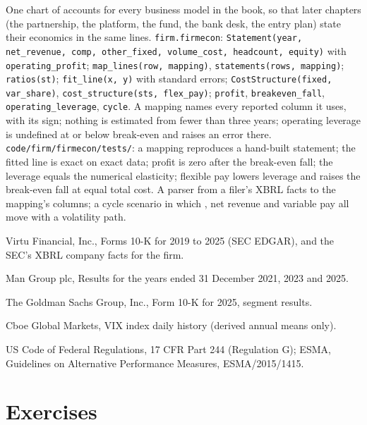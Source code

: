\begin{build}
 One chart of accounts for every business model in the book, so that later chapters (the partnership, the platform, the fund, the
bank desk, the entry plan) state their economics in the same lines.
 \texttt{firm.firmecon}: \texttt{Statement(year, net\_revenue, comp, other\_fixed, volume\_cost, headcount, equity)} with
\texttt{operating\_profit}; \texttt{map\_lines(row, mapping)}, \texttt{statements(rows, mapping)}; \texttt{ratios(st)}; \texttt{fit\_line(x, y)}
with standard errors; \texttt{CostStructure(fixed, var\_share)}, \texttt{cost\_structure(sts, flex\_pay)}; \texttt{profit},
\texttt{breakeven\_fall}, \texttt{operating\_leverage}, \texttt{cycle}.
 A mapping names every reported column it uses, with its sign; nothing is estimated from fewer than three years; operating leverage is
undefined at or below break-even and raises an error there.
 \texttt{code/firm/firmecon/tests/}: a mapping reproduces a hand-built statement; the fitted line is exact on exact data;
profit is zero after the break-even fall; the leverage equals the numerical elasticity; flexible pay lowers leverage and raises the break-even fall
at equal total cost.
 A parser from a filer's XBRL facts to the mapping's columns; a cycle scenario in which , net revenue and
variable pay all move with a volatility path.
\end{build}

\begin{omsources}
\item Virtu Financial, Inc., Forms 10-K for 2019 to 2025 (SEC EDGAR), and the SEC's XBRL company facts for the firm.
\item Man Group plc, Results for the years ended 31 December 2021, 2023 and 2025.
\item The Goldman Sachs Group, Inc., Form 10-K for 2025, segment results.
\item Cboe Global Markets, VIX index daily history (derived annual means only).
\item US Code of Federal Regulations, 17 CFR Part 244 (Regulation G); ESMA, Guidelines on Alternative Performance Measures, ESMA/2015/1415.
\end{omsources}

\section{Exercises}

